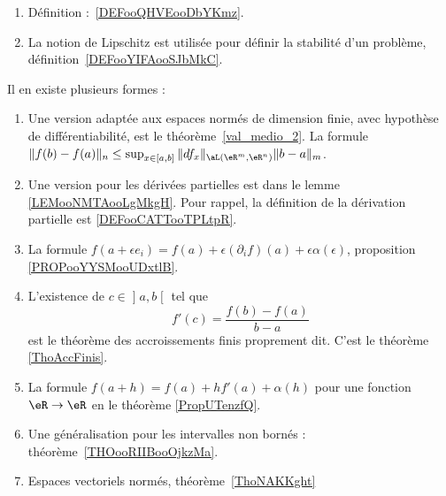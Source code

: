     \begin{enumerate}
    \item
        Définition :~\ref{DEFooQHVEooDbYKmz}.
    \item
        La notion de Lipschitz est utilisée pour définir la stabilité d'un problème, définition~\ref{DEFooYIFAooSJbMkC}.
    \end{enumerate}


            \label{INTERNooXFNTooNNaOzP}
    Il en existe plusieurs formes :
    \begin{enumerate}
        \item
            Une version adaptée aux espaces normés de dimension finie, avec hypothèse de différentiabilité, est le théorème~\ref{val_medio_2}. La formule $\|f(b)-f(a)\|_n\leq \sup_{x\in[a,b]}\|df_x\|_{\aL(\eR^m,\eR^n)}\|b-a\|_m$.
        \item
            Une version pour les dérivées partielles est dans le lemme \ref{LEMooNMTAooLgMkgH}. Pour rappel, la définition de la dérivation partielle est \ref{DEFooCATTooTPLtpR}.
        \item
            La formule \( f(a+\epsilon e_i)=f(a)+\epsilon(\partial_if)(a)+\epsilon\alpha(\epsilon)\), proposition \ref{PROPooYYSMooUDxtlB}.
        \item
        L'existence de \( c\in \mathopen] a , b \mathclose[\) tel que
            \begin{equation}
                f'(c)=\frac{ f(b)-f(a) }{ b-a }
            \end{equation}
            est le théorème des accroissements finis proprement dit. C'est le théorème \ref{ThoAccFinis}.
        \item
            La formule \( f(a+h)=f(a)+hf'(a)+\alpha(h)\) pour une fonction \( \eR\to \eR\) en le théorème \ref{PropUTenzfQ}.
        \item
            Une généralisation pour les intervalles non bornés : théorème~\ref{THOooRIIBooOjkzMa}.
        \item
            Espaces vectoriels normés, théorème~\ref{ThoNAKKght}
    \end{enumerate}

    \label{THEMEooGVCCooHBrNNd}

